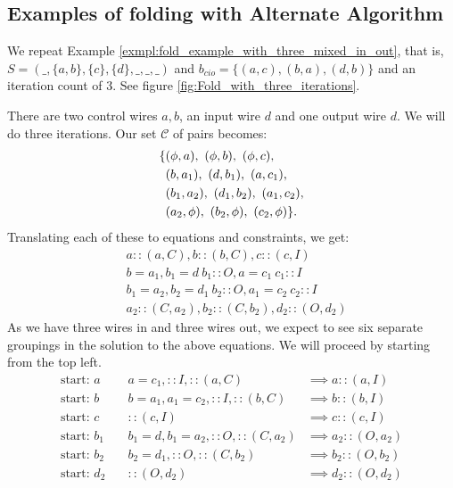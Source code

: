 \subsection{Examples of folding with Alternate Algorithm} %
\label{sub:examples_of_folding_with_alternate_algorithm}
\begin{example}\label{exmpl:alternate_fold_example_with_three_mixed_in_out}
  We repeat Example \ref{exmpl:fold_example_with_three_mixed_in_out}, that is,
  $S=(\_,\{a,b\},\{c\},\{d\},\_,\_,\_)$ and $b_{cio}=\{(a,c),(b,a),(d,b)\}$
  and an iteration count of $3$. See figure
  \ref{fig:Fold_with_three_iterations}.
\end{example}
There are two control wires $a,b$, an input wire $d$ and one output
wire $d$. We  will do three iterations. Our set $\mathcal{C}$ of pairs
becomes:
\begin{align*}
  \{ & (\phi,a),\ (\phi,b),\ (\phi,c),\\
  & (b,a_1),\ (d,b_1),\ (a,c_1),\\
  & (b_1,a_2),\ (d_1,b_2),\ (a_1,c_2),\\
  & (a_2,\phi),\ (b_2,\phi),\ (c_2,\phi)\}.\\
\end{align*}
Translating each of these to equations and constraints, we get:
\begin{align*}
  &a::(a,C), b::(b,C), c::(c,I)\\
  &b=a_1, b_1=d\ b_1::O, a=c_1\ c_1::I\\
  &b_1=a_2, b_2=d_1\ b_2::O, a_1=c_2\ c_2::I\\
  &a_2::(C,a_2), b_2::(C,b_2), d_2::(O,d_2)
\end{align*}
As we have three wires in and three wires out, we expect to see six separate
groupings in the solution to the above equations. We will proceed by starting
from the top left.
\begin{align*}
  \text{start: }a &\quad a=c_1, ::I, ::(a,C) &\implies a::(a,I)\\
  \text{start: }b &\quad  b=a_1,a_1=c_2, ::I, ::(b,C) &\implies b::(b,I)\\
  \text{start: }c &\quad  ::(c,I) &\implies c::(c,I)\\
  \text{start: }b_1 &\quad  b_1=d, b_1=a_2, ::O, ::(C,a_2) &\implies
    a_2::(O,a_2)\\
  \text{start: }b_2 &\quad  b_2=d_1, ::O, ::(C,b_2) &\implies b_2::(O,b_2)\\
  \text{start: }d_2 &\quad  ::(O,d_2) &\implies d_2::(O,d_2)
\end{align*}



